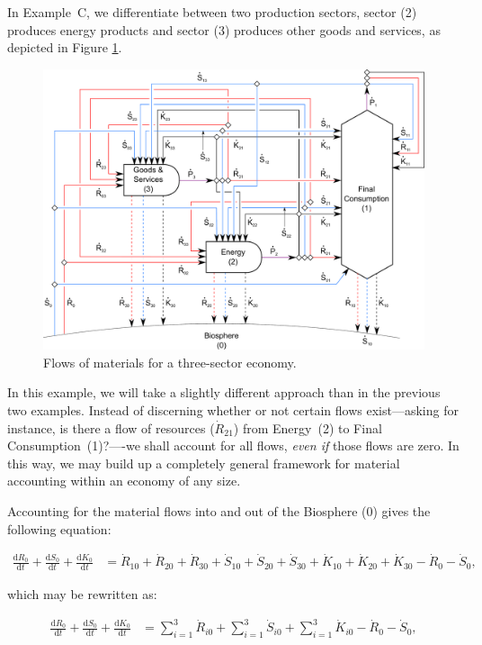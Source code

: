 In Example~C, we differentiate between two production sectors, sector (2) produces energy
products and sector (3) produces other goods and services, as depicted in Figure
\ref{fig:C_materials}.

\begin{figure}[!ht]
\centering
\includegraphics[width=0.8\linewidth]{Part_1/Chapter_Materials/images/3_sector_materials.pdf}
\caption[Flows of materials for a three-sector economy]{Flows of materials for a three-sector economy.}
\label{fig:C_materials}
\end{figure}

In this example, we will take a slightly different approach
than in the previous two examples. 
Instead of discerning whether or not certain flows exist---asking for instance,
is there a flow of resources ($\dot{R}_{21}$) from
Energy~(2) to Final Consumption~(1)?----we
shall account for all flows,
\emph{even if} those flows are zero.
In this way,
we may build up a completely general
framework for material accounting within an economy
of any size.

Accounting for the material flows 
into and out of the Biosphere 
(0) gives the following equation:

\begin{align} \label{eq:C_CV_0}
	\frac{\mathrm{d}R_{0}}{\mathrm{d}t} 
	+ \frac{\mathrm{d}S_{0}}{\mathrm{d}t}	
	+ \frac{\mathrm{d}K_0}{\mathrm{d}t}		
	& =  \dot{R}_{10} + \dot{R}_{20} + \dot{R}_{30}
	+ \dot{S}_{10} + \dot{S}_{20} + \dot{S}_{30}
	+ \dot{K}_{10} + \dot{K}_{20} + \dot{K}_{30}
	- \dot{R}_{0} 
	- \dot{S}_{0},
\end{align}

\noindent{}which may be rewritten as:

\begin{align} \label{eq:C_CV_0_b}
	\frac{\mathrm{d}R_{0}}{\mathrm{d}t} 
	+ \frac{\mathrm{d}S_{0}}{\mathrm{d}t}	
	+ \frac{\mathrm{d}K_0}{\mathrm{d}t}		
	& =  \sum_{i = 1}^{3}\dot{R}_{i0}
	+ \sum_{i = 1}^{3}\dot{S}_{i0}
	+ \sum_{i = 1}^{3}\dot{K}_{i0}
	- \dot{R}_{0} 
	- \dot{S}_{0},
\end{align}


